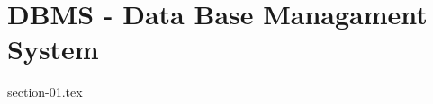 \chapter{DBMS - Data Base Managament System}%
\label{cha:DBMS - Data Base Managament System}
{section-01.tex}
